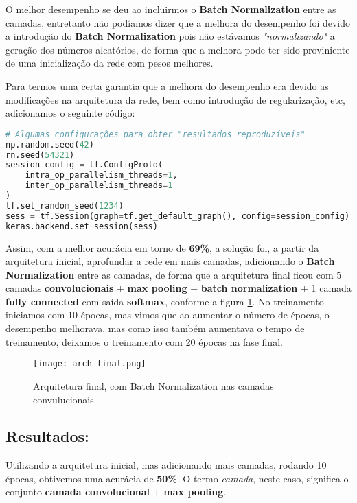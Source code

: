 O melhor desempenho se deu ao incluirmos o \textbf{Batch Normalization} entre as
camadas, entretanto não podíamos dizer que a melhora do desempenho foi devido a
introdução do \textbf{Batch Normalization} pois não estávamos
\emph{"normalizando"} a geração dos números aleatórios, de forma que a
melhora pode ter sido proviniente de uma inicialização da rede com pesos
melhores.

Para termos uma certa garantia que a melhora do desempenho era devido as
modificações na arquitetura da rede, bem como introdução de regularização,
etc, adicionamos o seguinte código:

\begin{lstlisting}[language=Python]
# Algumas configurações para obter "resultados reproduzíveis"
np.random.seed(42)
rn.seed(54321)
session_config = tf.ConfigProto(
    intra_op_parallelism_threads=1,
    inter_op_parallelism_threads=1
)
tf.set_random_seed(1234)
sess = tf.Session(graph=tf.get_default_graph(), config=session_config)
keras.backend.set_session(sess)
\end{lstlisting}

Assim, com a melhor acurácia em torno de \textbf{69\%}, a solução
foi, a partir da arquitetura inicial, aprofundar a rede em mais camadas,
adicionando o \textbf{Batch Normalization} entre as camadas, de forma
que a arquitetura final ficou com 5 camadas \textbf{convolucionais} +
\textbf{max pooling} + \textbf{batch normalization} + 1 camada
\textbf{fully connected} com saída \textbf{softmax}, conforme a figura \ref{fig:arch-final}.
No treinamento iniciamos com 10 épocas, mas vimos que ao aumentar o número de épocas, o
desempenho melhorava, mas como isso também aumentava o tempo de treinamento, deixamos
o treinamento com 20 épocas na fase final.

\begin{figure}[ht]
\centering
\texttt{[image: arch-final.png]}
\caption{Arquitetura final, com Batch Normalization nas camadas convulucionais}\label{fig:arch-final}
\end{figure}

    \subsection{Resultados:}\label{resultados}

Utilizando a arquitetura inicial, mas adicionando mais camadas, rodando 10 épocas,
obtivemos uma acurácia de \textbf{50\%}. O termo \emph{camada}, neste caso, significa
o conjunto \textbf{camada convolucional} + \textbf{max pooling}.

